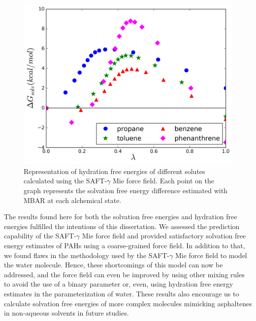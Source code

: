 \documentclass[final,12p,times,twocolumn]{elsarticle}
\begin{document}
	\begin{figure}
		\centering
		\includegraphics[width=1.0\linewidth]{Figures/waterart}
		\caption{Representation of hydration free energies of different solutes calculated using the SAFT-$\gamma$ Mie force field. Each point on the graph represents the solvation free energy difference estimated with MBAR at each alchemical state.}
		\label{fig:water}
	\end{figure}
	
	The results found here for both the solvation free energies and hydration free energies fulfilled the intentions of this dissertation. We assessed the prediction capability of the SAFT-$\gamma$ Mie force field and provided satisfactory solvation free energy estimates of PAHs using a coarse-grained force field. In addition to that, we found flaws in the methodology used by the SAFT-$\gamma$ Mie force field to model the water molecule. Hence, these shortcomings of this model can now be addressed, and the force field can even be improved by using other mixing rules to avoid the use of a binary parameter or, even, using hydration free energy estimates in the parameterization of water. These results also encourage us to calculate solvation free energies of more complex molecules mimicking asphaltenes in non-aqueous solvents in future studies.  
	
\end{document}
